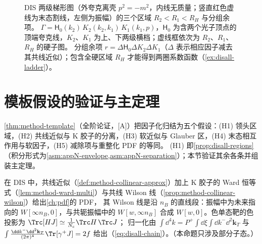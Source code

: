 \begin{figure}[htbp]
\caption{DIS 两级梯形图（外夸克离壳 $p^2=-m^2$，内线无质量；竖直红色虚线为末态割线，左侧为振幅）的三个区域 $R_2<R_1<R_H$ 与分组余项。
$\Gamma=\mathsf H_0(k_2)\,K_2(k_2,k_1)\,K_1(k_1,p)$，$\mathsf H_0$ 为含两个光子顶点的顶端夸克线，$K_2$、$K_1$ 为上、下两级横档；虚线框依次为 $R_2$、$R_1$、$R_H$ 的硬子图。
分组余项 $r=\Delta\mathsf H_0\Delta K_2\Delta K_1$（$\Delta$ 表示相应因子减去其共线近似）；包含全硬区域 $R_H$ 才能得到两圈系数函数（\cref{ex:disall-ladder}）。}
\label{fig:disall-ladder-regions}
\end{figure}
\section{模板假设的验证与主定理}\label{sec:disall-theorem}

\cref{thm:method-template}（全阶论证，[A]）把因子化归结为五个假设：(H1) 领头区域，(H2) 共线近似与 K 胶子的分离，(H3) 软近似与 Glauber 区，(H4) 末态相互作用与软因子，(H5) 减除项与重整化 PDF 的等同。
(H1) 即\cref{prop:disall-regions}（积分形式为\cref{asm:appN-envelope,asm:appN-separation}）；本节验证其余各条并组装主定理。

\begin{proposition}\label{prop:disall-h2}
在 DIS 中，共线近似（\cref{def:method-collinear-approx}）加上 K 胶子的 Ward 恒等式（\cref{lem:method-ward-multi}）与共线 Wilson 线（\cref{prop:method-collinear-wilson}）给出\cref{ch:pdf}的 PDF，
其 Wilson 线是沿 $n_B$ 的直线段：振幅中为未来指向的 $W[\infty n_B,0]$，与共轭振幅中的 $W[w,\infty n_B]$ 合成 $W[w,0]$。色单态靶的色投影为 $\Trc[HJ]\simeq\frac1{N_c}\Trc H\,\Trc J$；
归一化由 $\int\dd^4k=P^+\!\int\dd\xi\int\dd k^-\dd^2\mathbf k_T$ 与 $\int\frac{\dd k^-\dd^2\mathbf k_T}{(2\pi)^4}\Tr[\gamma^+J]=2f$ 给出（\cref{eq:disall-chain}）。（本命题只涉及部分子态。）
\end{proposition}

